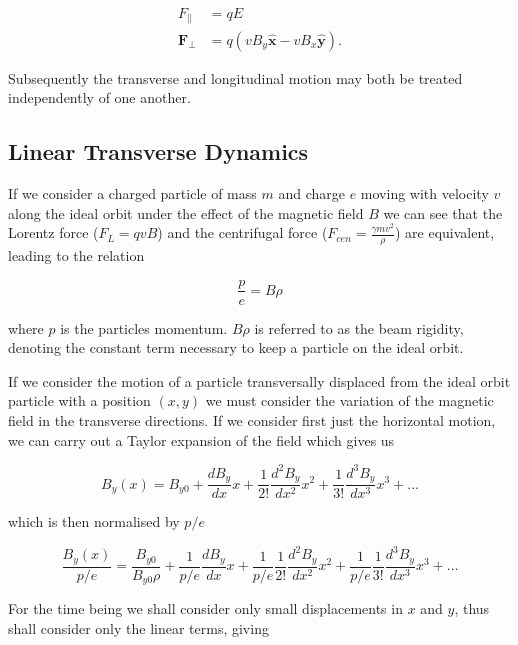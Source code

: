 \begin{align}
F_{\parallel} &= qE \\
\mathbf{F_{\perp}} &= q \left( vB_{y} \mathbf{\hat{x}} - vB_{x} \mathbf{\hat{y}} \right).
\end{align}

Subsequently the transverse and longitudinal motion may both be treated independently of one another.

\subsection{Linear Transverse Dynamics}

If we consider a charged particle of mass $m$ and charge $e$ moving with velocity $v$ along the ideal orbit under the effect of the magnetic field $B$ we can see that the Lorentz force ($F_{L} = qvB$) and the centrifugal force ($F_{cen} = \frac{\gamma m v^{2}}{\rho}$) are equivalent, leading to the relation

\begin{equation}
\frac{p}{e} = B \rho
\label{eqn:beam-rigid}
\end{equation}

where $p$ is the particles momentum. $B \rho$ is referred to as the beam rigidity, denoting the constant term necessary to keep a particle on the ideal orbit. 

If we consider the motion of a particle transversally displaced from the ideal orbit particle with a position $(x, y)$ we must consider the variation of the magnetic field in the transverse directions. If we consider first just the horizontal motion, we can carry out a Taylor expansion of the field which gives us

\begin{equation}
B_{y} \left( x \right) = B_{y0} + \frac{dB_{y}}{dx} x + \frac{1}{2!}\frac{d^{2}B_{y}}{dx^{2}} x^{2} + \frac{1}{3!} \frac{d^{3}B_{y}}{dx^{3}} x^{3} + ...
\end{equation}

which is then normalised by $p/e$

\begin{equation}
\frac{B_{y} \left( x \right)}{p/e} = \frac{B_{y0}}{B_{y0}\rho} + \frac{1}{p/e}\frac{dB_{y}}{dx} x + \frac{1}{p/e}\frac{1}{2!}\frac{d^{2}B_{y}}{dx^{2}} x^{2} + \frac{1}{p/e}\frac{1}{3!} \frac{d^{3}B_{y}}{dx^{3}} x^{3} + ...
\end{equation}

For the time being we shall consider only small displacements in $x$ and $y$, thus shall consider only the linear terms, giving


